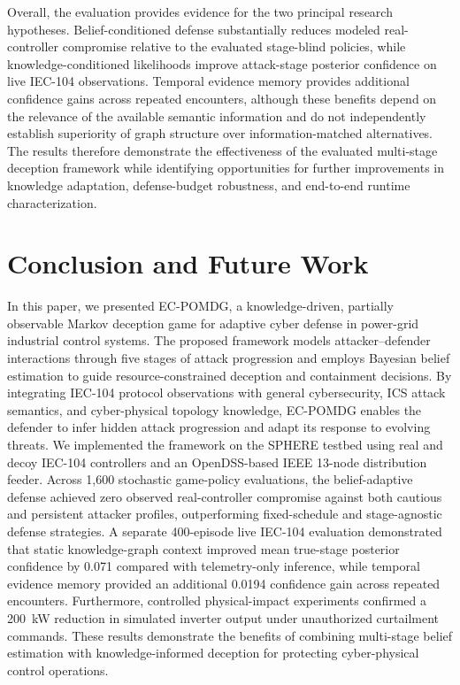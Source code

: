 \documentclass[10pt,conference]{IEEEtran}
\begin{document}
Overall, the evaluation provides evidence for the two principal research hypotheses. Belief-conditioned defense substantially reduces modeled real-controller compromise relative to the evaluated stage-blind policies, while knowledge-conditioned likelihoods improve attack-stage posterior confidence on live IEC-104 observations. Temporal evidence memory provides additional confidence gains across repeated encounters, although these benefits depend on the relevance of the available semantic information and do not independently establish superiority of graph structure over information-matched alternatives. The results therefore demonstrate the effectiveness of the evaluated multi-stage deception framework while identifying opportunities for further improvements in knowledge adaptation, defense-budget robustness, and end-to-end runtime characterization.


\section{Conclusion and Future Work}
\label{sec:conclusion}

In this paper, we presented EC-POMDG, a knowledge-driven, partially observable Markov deception game for adaptive cyber defense in power-grid industrial control systems. The proposed framework models attacker--defender interactions through five stages of attack progression and employs Bayesian belief estimation to guide resource-constrained deception and containment decisions. By integrating IEC-104 protocol observations with general cybersecurity, ICS attack semantics, and cyber-physical topology knowledge, EC-POMDG enables the defender to infer hidden attack progression and adapt its response to evolving threats. We implemented the framework on the SPHERE testbed using real and decoy IEC-104 controllers and an OpenDSS-based IEEE 13-node distribution feeder. Across 1,600 stochastic game-policy evaluations, the belief-adaptive defense achieved zero observed real-controller compromise against both cautious and persistent attacker profiles, outperforming fixed-schedule and stage-agnostic defense strategies. A separate 400-episode live IEC-104 evaluation demonstrated that static knowledge-graph context improved mean true-stage posterior confidence by 0.071 compared with telemetry-only inference, while temporal evidence memory provided an additional 0.0194 confidence gain across repeated encounters. Furthermore, controlled physical-impact experiments confirmed a 200~kW reduction in simulated inverter output under unauthorized curtailment commands. These results demonstrate the benefits of combining multi-stage belief estimation with knowledge-informed deception for protecting cyber-physical control operations.
\end{document}
